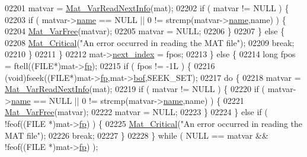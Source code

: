 \begin{DoxyCode}
{{{{{{{{{{{{{{{{{{{{{{{{{{{{{{{{{{{{{{{{{{{02201             matvar = \hyperlink{group___m_a_t_ga72dd99330507b17177e22f9ed3bea5e6}{Mat\_VarReadNextInfo}(mat);
02202             \textcolor{keywordflow}{if} ( matvar != NULL ) \{
02203                 \textcolor{keywordflow}{if} ( matvar->\hyperlink{group___m_a_t_a5d4b55b041e3b4fb50c04337f05ad909}{name} == NULL || 0 != strcmp(matvar->\hyperlink{group___m_a_t_a5d4b55b041e3b4fb50c04337f05ad909}{name},name) ) \{
02204                     \hyperlink{group___m_a_t_ga1d14716f7450530fd1c9d02413787f0e}{Mat\_VarFree}(matvar);
02205                     matvar = NULL;
02206                 \}
02207             \} \textcolor{keywordflow}{else} \{
02208                 \hyperlink{group__mat__util_gaf51f2bfbb5580f575e4dd79757e2b80c}{Mat\_Critical}(\textcolor{stringliteral}{"An error occurred in reading the MAT file"});
02209                 \textcolor{keywordflow}{break};
02210             \}
02211         \}
02212         mat->\hyperlink{struct__mat__t_a0163a12f9735356723bb604992639d9e}{next\_index} = fpos;
02213     \} \textcolor{keywordflow}{else} \{
02214         \textcolor{keywordtype}{long} fpos = ftell((FILE*)mat->\hyperlink{struct__mat__t_a85f562e407ca9ad4d2a6e14f839432b7}{fp});
02215         \textcolor{keywordflow}{if} ( fpos != -1L ) \{
02216             (void)fseek((FILE*)mat->\hyperlink{struct__mat__t_a85f562e407ca9ad4d2a6e14f839432b7}{fp},mat->\hyperlink{struct__mat__t_a0f87794a6113bd568fe591953e20ddf3}{bof},SEEK\_SET);
02217             \textcolor{keywordflow}{do} \{
02218                 matvar = \hyperlink{group___m_a_t_ga72dd99330507b17177e22f9ed3bea5e6}{Mat\_VarReadNextInfo}(mat);
02219                 \textcolor{keywordflow}{if} ( matvar != NULL ) \{
02220                     \textcolor{keywordflow}{if} ( matvar->\hyperlink{group___m_a_t_a5d4b55b041e3b4fb50c04337f05ad909}{name} == NULL || 0 != strcmp(matvar->\hyperlink{group___m_a_t_a5d4b55b041e3b4fb50c04337f05ad909}{name},name) ) \{
02221                         \hyperlink{group___m_a_t_ga1d14716f7450530fd1c9d02413787f0e}{Mat\_VarFree}(matvar);
02222                         matvar = NULL;
02223                     \}
02224                 \} \textcolor{keywordflow}{else} \textcolor{keywordflow}{if} ( !feof((FILE *)mat->\hyperlink{struct__mat__t_a85f562e407ca9ad4d2a6e14f839432b7}{fp}) ) \{
02225                     \hyperlink{group__mat__util_gaf51f2bfbb5580f575e4dd79757e2b80c}{Mat\_Critical}(\textcolor{stringliteral}{"An error occurred in reading the MAT file"});
02226                     \textcolor{keywordflow}{break};
02227                 \}
02228             \} \textcolor{keywordflow}{while} ( NULL == matvar && !feof((FILE *)mat->\hyperlink{struct__mat__t_a85f562e407ca9ad4d2a6e14f839432b7}{fp}) );
}}}}}}}}}}}}}}}}}}}}}}}}}}}}}}}}}}}}}}}}}}}
\end{DoxyCode}

